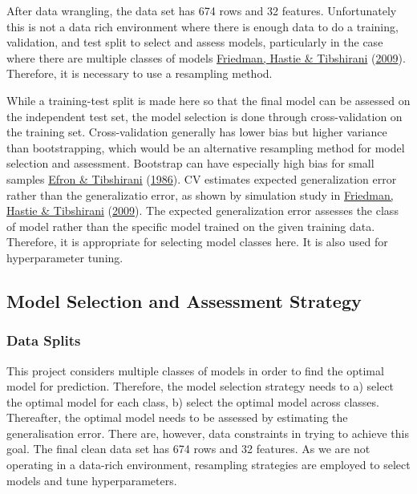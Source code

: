 \documentclass[11pt,preprint, authoryear]{elsarticle}
\numberwithin{equation}{section}
\numberwithin{figure}{section}
\numberwithin{table}{section}
\begin{document}
After data wrangling, the data set has 674 rows and 32 features.
Unfortunately this is not a data rich environment where there is enough
data to do a training, validation, and test split to select and assess
models, particularly in the case where there are multiple classes of
models \protect\hyperlink{ref-ESL}{Friedman, Hastie \& Tibshirani}
(\protect\hyperlink{ref-ESL}{2009}). Therefore, it is necessary to use a
resampling method.

While a training-test split is made here so that the final model can be
assessed on the independent test set, the model selection is done
through cross-validation on the training set. Cross-validation generally
has lower bias but higher variance than bootstrapping, which would be an
alternative resampling method for model selection and assessment.
Bootstrap can have especially high bias for small samples
\protect\hyperlink{ref-Efron}{Efron \& Tibshirani}
(\protect\hyperlink{ref-Efron}{1986}). CV estimates expected
generalization error rather than the generalizatio error, as shown by
simulation study in \protect\hyperlink{ref-ESL}{Friedman, Hastie \&
Tibshirani} (\protect\hyperlink{ref-ESL}{2009}). The expected
generalization error assesses the class of model rather than the
specific model trained on the given training data. Therefore, it is
appropriate for selecting model classes here. It is also used for
hyperparameter tuning.

\hypertarget{model-selection-and-assessment-strategy}{%
\subsection{Model Selection and Assessment
Strategy}\label{model-selection-and-assessment-strategy}}

\hypertarget{data-splits}{%
\subsubsection{Data Splits}\label{data-splits}}

This project considers multiple classes of models in order to find the
optimal model for prediction. Therefore, the model selection strategy
needs to a) select the optimal model for each class, b) select the
optimal model across classes. Thereafter, the optimal model needs to be
assessed by estimating the generalisation error. There are, however,
data constraints in trying to achieve this goal. The final clean data
set has 674 rows and 32 features. As we are not operating in a data-rich
environment, resampling strategies are employed to select models and
tune hyperparameters.
\end{document}
